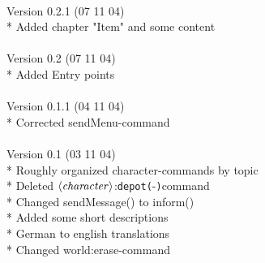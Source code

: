 \documentclass[a4paper,10pt,makeidx]{scrreprt}
\newcommand{\com}[2]{\index{#1}\texttt{#1(}#2\texttt{)}}
\newcommand{\var}[1]{$\left\langle \text{\emph{#1}} \right\rangle$}
\begin{document}
\\
Version 0.2.1 (07 11 04)\\
* Added chapter "Item" and some content\\
\\
Version 0.2 (07 11 04)\\
* Added Entry points\\
\\
Version 0.1.1 (04 11 04)\\
* Corrected sendMenu-command\\
\\
Version 0.1 (03 11 04)\\
* Roughly organized character-commands by topic\\
* Deleted \var{character}:\com{depot}-command\\
* Changed sendMessage() to inform()\\
* Added some short descriptions\\
* German to english translations\\
* Changed world:erase-command

\printindex
\end{document}
